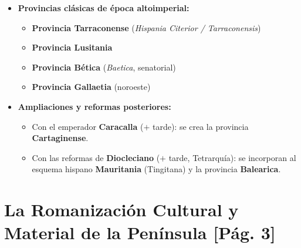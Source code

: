 \documentclass[11pt,letterpaper]{article}
\begin{document}
\begin{notabox}[title={Secuencia Cronológica de la Organización Provincial}]
  \begin{itemize}
    \item \textbf{Provincias clásicas de época altoimperial:}
    \begin{itemize}
      \item \textbf{Provincia Tarraconense} (\textit{Hispania Citerior / Tarraconensis})
      \item \textbf{Provincia Lusitania}
      \item \textbf{Provincia Bética} (\textit{Baetica}, senatorial)
      \item \textbf{Provincia Gallaetia} (noroeste)
    \end{itemize}
    \item \textbf{Ampliaciones y reformas posteriores:}
    \begin{itemize}
      \item Con el emperador \textbf{Caracalla} ($+$ tarde): se crea la provincia \textbf{Cartaginense}.
      \item Con las reformas de \textbf{Diocleciano} ($+$ tarde, Tetrarquía): se incorporan al esquema hispano \textbf{Mauritania} (Tingitana) y la provincia \textbf{Balearica}.
    \end{itemize}
  \end{itemize}
\end{notabox}

\bigskip

\newpage
\section{La Romanización Cultural y Material de la Península \hfill\normalfont\small\color{gray}[Pág. 3]}
\end{document}
